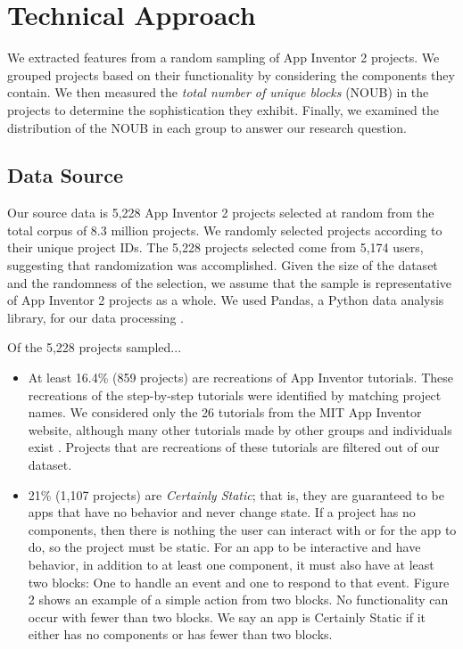 \documentclass[conference]{IEEEtran}
\begin{document}
\section{Technical Approach}

We extracted features from a random sampling of App Inventor 2 projects. We grouped projects based on their functionality by considering the components they contain. We then measured the \emph{total number of unique blocks} (NOUB) in the projects to determine the sophistication they exhibit. Finally, we examined the distribution of the NOUB in each group to answer our research question.


\subsection{Data Source}
Our source data is 5,228 App Inventor 2 projects selected at random from the total corpus of 8.3 million projects. We randomly selected projects according to their unique project IDs. The 5,228 projects selected come from 5,174 users, suggesting that randomization was accomplished. Given the size of the dataset and the randomness of the selection, we assume that the sample is representative of App Inventor 2 projects as a whole. We used Pandas, a Python data analysis library, for our data processing \cite{pandas}.


Of the 5,228 projects sampled...
\begin{itemize}
	\item At least 16.4\% (859 projects) are recreations of App Inventor tutorials. These recreations of the step-by-step tutorials were identified by matching project names. We considered only the 26 tutorials from the MIT App Inventor website, although many other tutorials made by other groups and individuals exist \cite{course_in_box} \cite{imagnity}. Projects that are recreations of these tutorials are filtered out of our dataset.
	\item 21\% (1,107 projects) are \emph{Certainly Static}; that is, they are guaranteed to be apps that have no behavior and never change state. If a project has no components, then there is nothing the user can interact with or for the app to do, so the project must be static. For an app to be interactive and have behavior, in addition to at least one component, it must also have at least two blocks: One to handle an event and one to respond to that event. Figure 2 shows an example of a simple action from two blocks. No functionality can occur with fewer than two blocks. We say an app is Certainly Static if it either has no components or has fewer than two blocks.
\end{itemize}
\end{document}
